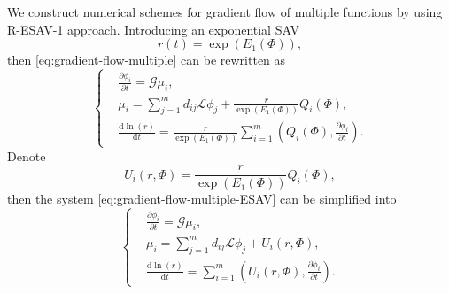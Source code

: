 \documentclass[final,review,onefignum,onetabnum]{siamart190516}
\theoremstyle{plain}
\begin{document}
We construct numerical schemes for gradient flow of multiple functions by using R-ESAV-1 approach. 
 Introducing an exponential SAV 
 \begin{equation}
 	r(t)=\exp\left(E_{1}\left(\Phi\right)\right),
 \end{equation}
then \eqref{eq:gradient-flow-multiple} can be rewritten as 
\begin{equation}\label{eq:gradient-flow-multiple-ESAV} 
\left\{\begin{aligned}
& \frac{\partial \phi_{i}}{\partial t} =\mathcal{G} \mu_{i}, \\ 
& \mu_{i} =\sum_{j=1}^{m}d_{ij} \mathcal{L} \phi_{j}+\frac{r}{\exp\left(E_{1}\left(\Phi\right)\right)} Q_{i}\left(\Phi\right), \\ 
& \frac{\mathrm{d}\ln(r)}{\mathrm{d} t} =\frac{r}{\exp\left(E_{1}\left(\Phi\right)\right)}\sum_{i=1}^{m}\left(Q_{i}\left(\Phi\right), \frac{\partial \phi_{i}}{\partial t} \right).
\end{aligned}\right. 
\end{equation}
Denote 
$$U_{i}(r, \Phi)=\frac{r}{\exp\left(E_{1}\left(\Phi\right)\right)} Q_{i}\left(\Phi\right),$$
then the system \eqref{eq:gradient-flow-multiple-ESAV} can be simplified into
\begin{equation}\label{eq:gradient-flow-multiple-ESAV-1} 
\left\{\begin{aligned}
& \frac{\partial \phi_{i}}{\partial t} =\mathcal{G} \mu_{i}, \\ 
& \mu_{i} =\sum_{j=1}^{m}d_{ij} \mathcal{L} \phi_{j}+U_{i}(r, \Phi), \\ 
& \frac{\mathrm{d}\ln(r)}{\mathrm{d} t} =\sum_{i=1}^{m} \left(U_{i}(r, \Phi), \frac{\partial \phi_{i}}{\partial t} \right).
\end{aligned}\right. 
\end{equation}
\end{document}
